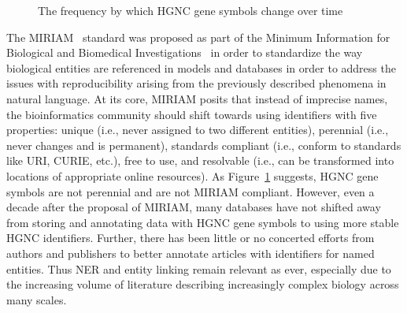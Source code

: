 \begin{figure}
    \captionsetup{format=plain}
    \caption[HGNC Gene Symbol Half Lives]{The frequency by which \ac{HGNC} gene symbols change over time}
    \label{fig:gene_symbol_half_life}
\end{figure}

The \ac{MIRIAM}~\cite{Laibe2007} standard was proposed as part of the Minimum Information for Biological and Biomedical Investigations~\cite{Taylor2008} in order to standardize the way biological entities are referenced in models and databases in order to address the issues with reproducibility arising from the previously described phenomena in natural language.
At its core, \ac{MIRIAM} posits that instead of imprecise names, the bioinformatics community should shift towards using identifiers with five properties: unique (i.e., never assigned to two different entities), perennial (i.e., never changes and is permanent), standards compliant (i.e., conform to standards like \ac{URI}, \ac{CURIE}, etc.), free to use, and resolvable (i.e., can be transformed into locations of appropriate online resources).
As Figure~\ref{fig:gene_symbol_half_life} suggests, \ac{HGNC} gene symbols are not perennial and are not \ac{MIRIAM} compliant.
However, even a decade after the proposal of \ac{MIRIAM}, many databases have not shifted away from storing and annotating data with \ac{HGNC} gene symbols to using more stable \ac{HGNC} identifiers.
Further, there has been little or no concerted efforts from authors and publishers to better annotate articles with identifiers for named entities.
Thus \ac{NER} and entity linking remain relevant as ever, especially due to the increasing volume of literature describing increasingly complex biology across many scales.
